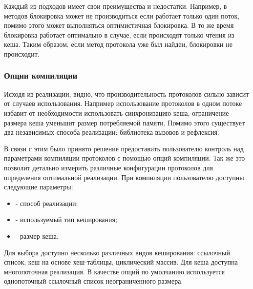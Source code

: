 Каждый из подходов имеет свои преимущества и недостатки. Например, в  методов блокировка может не производиться если работает только один поток, помимо этого может выполняться оптимистичная блокировка. В то же время  блокировка работает оптимально в случае, если происходят только чтения из кеша. Таким образом, если метод протокола уже был найден, блокировки не происходит.

\subsubsection{Опции компиляции}

Исходя из реализации, видно, что производительность протоколов сильно зависит от случаев использования. Например использование протоколов в одном потоке избавит от необходимости использовать синхронизацию кеша, ограничение размера кеша уменьшит размер потребляемой памяти. Помимо этого существует два независимых способа реализации: библиотека вызовов и рефлексия.

В связи с этим было принято решение предоставить пользователю контроль над параметрами компиляции протоколов с помощью опций компиляции. Так же это позволит детально измерить различные конфигурации протоколов для определения оптимальной реализации. При компиляции пользователю доступны следующие параметры:
\begin{itemize}
  \item {} - способ реализации;
  \item {} - используемый тип кеширования;
  \item {} - размер кеша.
\end{itemize}

Для выбора доступно несколько различных видов кеширования: ссылочный список,  кеш\cite{Johnson:1994:LOH:645920.672996} на основе хеш-таблицы, циклический массив. Для кеша доступна многопоточная реализация. В качестве опций по умолчанию используется однопоточный ссылочный список неограниченного размера.

